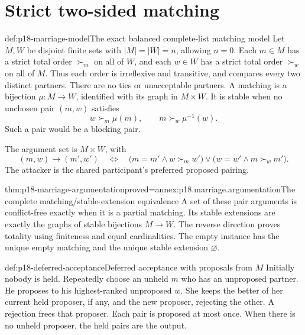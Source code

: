 \section{Strict two-sided matching}

\begin{hbdefinition}{def:p18-marriage-model}{The exact balanced complete-list matching model}
Let \(M,W\) be disjoint finite sets with
\(|M|=|W|=n\), allowing \(n=0\).
Each \(m\in M\) has a strict total
order \(\succ_m\) on all of \(W\),
and each \(w\in W\) has a strict
total order \(\succ_w\) on all of \(M\).
Thus each order is irreflexive and transitive,
and compares every two distinct partners.
There are no ties or unacceptable partners.
A matching is a bijection \(\mu:M\to W\),
identified with its graph in \(M\times W\).
It is stable when no unchosen pair
\((m,w)\) satisfies
\[
                        w\succ_m\mu(m),\qquad
                        m\succ_w\mu^{-1}(w).
\]
Such a pair would be a blocking pair.

The argument set is \(M\times W\), with
\[
 (m,w)\to(m',w')\quad\Longleftrightarrow\quad
 \bigl(m=m'\land w\succ_m w'\bigr)
       \lor\bigl(w=w'\land m\succ_w m'\bigr).
\]
The attacker is the shared participant's
preferred proposed pairing.
\end{hbdefinition}

\begin{hbtheorem}{thm:p18-marriage-argumentation}{proved=annex:p18.marriage.argumentation}{The complete matching/stable-extension equivalence}
A set of these pair arguments is
conflict-free exactly when it is
a partial matching. Its stable
extensions are exactly the graphs
of stable bijections \(M\to W\).
The reverse direction proves
totality using finiteness and
equal cardinalities. The empty
instance has the unique empty
matching and the unique stable
extension \(\varnothing\).
\end{hbtheorem}

\begin{hbmethod}{def:p18-deferred-acceptance}{Deferred acceptance with proposals from \(M\)}
Initially nobody is held. Repeatedly choose
an unheld \(m\) who has an unproposed
partner. He proposes to his highest-ranked
unproposed \(w\). She keeps the better
of her current held proposer, if any,
and the new proposer, rejecting the
other. A rejection frees that proposer.
Each pair is proposed at most once.
When there is no unheld proposer,
the held pairs are the output.
\end{hbmethod}

